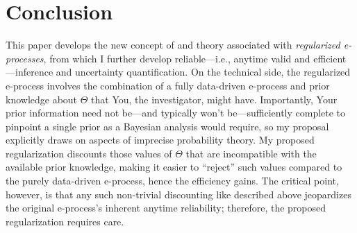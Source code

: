 \documentclass[a4paper, 12pt]{article}
\theoremstyle{plain}
\theoremstyle{definition}
\theoremstyle{remark}
\newcommand{\credal}{\mathscr{Q}}
\begin{document}
%





\section{Conclusion}
\label{S:discuss}

This paper develops the new concept of and theory associated with {\em regularized e-processes}, from which I further develop reliable---i.e., anytime valid and efficient---inference and uncertainty quantification.  On the technical side, the regularized e-process involves the combination of a fully data-driven e-process and prior knowledge about $\Theta$ that You, the investigator, might have.  Importantly, Your prior information need not be---and typically won't be---sufficiently complete to pinpoint a single prior as a Bayesian analysis would require, so my proposal explicitly draws on aspects of imprecise probability theory.  My proposed regularization discounts those values of $\Theta$ that are incompatible with the available prior knowledge, making it easier to ``reject'' such values compared to the purely data-driven e-process, hence the efficiency gains.  The critical point, however, is that any such non-trivial discounting like described above jeopardizes the original e-process's inherent anytime reliability; therefore, the proposed regularization requires care.  
\end{document}
